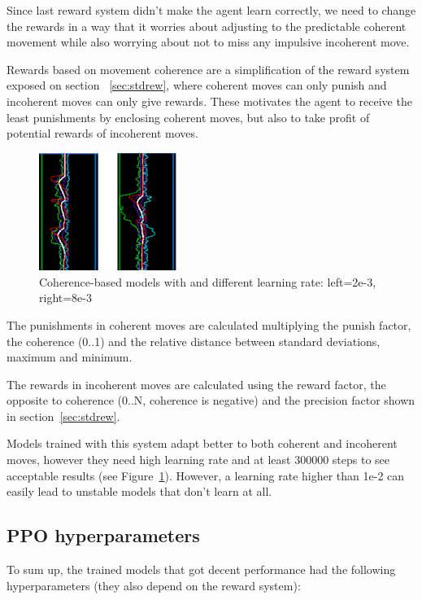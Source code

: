 Since last reward system didn't make the agent learn correctly, we need to change the rewards in a way that it worries about adjusting to the predictable coherent movement while also worrying about not to miss any impulsive incoherent move.

Rewards based on movement coherence are a simplification of the reward system exposed on section ~\ref{sec:stdrew}, where coherent moves can only punish and incoherent moves can only give rewards. These motivates the agent to receive the least punishments by enclosing coherent moves, but also to take profit of potential rewards of incoherent moves. 

\begin{figure}
    \centering
    \includegraphics[width=0.4\textwidth]{img/graphsCoherence.png}
		\caption{Coherence-based models with and different learning rate: left=2e-3, right=8e-3}
		\label{fig:precisionR}
\end{figure}

The punishments in coherent moves are calculated multiplying the punish factor, the coherence (0..1) and the relative distance between standard deviations, maximum and minimum.

The rewards in incoherent moves are calculated using the reward factor, the opposite to coherence (0..N, coherence is negative) and the precision factor shown in section~\ref{sec:stdrew}.

Models trained with this system adapt better to both coherent and incoherent moves, however they need high learning rate and at least 300000 steps to see acceptable results (see Figure~\ref{fig:precisionR}). However, a learning rate higher than 1e-2 can easily lead to unstable models that don't learn at all.

\subsection{PPO hyperparameters}

To sum up, the trained models that got decent performance had the following hyperparameters (they also depend on the reward system):

